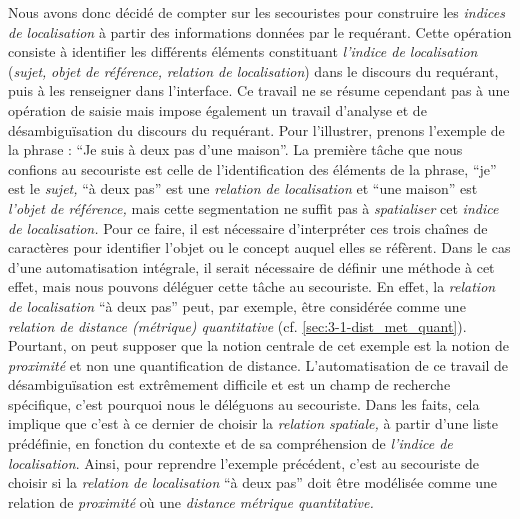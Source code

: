 Nous avons donc décidé de compter sur les secouristes pour construire
les \emph{indices de localisation} à partir des informations données
par le requérant. Cette opération consiste à identifier les différents
éléments constituant \emph{l'indice de localisation} (\emph{sujet,}
\emph{objet de référence,} \emph{relation de localisation}) dans le
discours du requérant, puis à les renseigner dans l'interface. Ce
travail ne se résume cependant pas à une opération de saisie mais
impose également un travail d'analyse et de désambiguïsation du
discours du requérant. Pour l'illustrer, prenons l'exemple de la
phrase : \enquote{Je suis à deux pas d'une maison}. La première tâche
que nous confions au secouriste est celle de l'identification des
éléments de la phrase, \enquote{je} est le \emph{sujet,} \enquote{à
  deux pas} est une \emph{relation de localisation} et \enquote{une
  maison} est \emph{l'objet de référence,} mais cette segmentation ne
suffit pas à \emph{spatialiser} cet \emph{indice de localisation.}
Pour ce faire, il est nécessaire d'interpréter ces trois chaînes de
caractères pour identifier l'objet ou le concept auquel elles se
réfèrent. Dans le cas d'une automatisation intégrale, il serait
nécessaire de définir une méthode à cet effet, mais nous pouvons
déléguer cette tâche au secouriste. En effet, la \emph{relation de
  localisation} \enquote{à deux pas} peut, par exemple, être
considérée comme une \emph{relation de distance (métrique)
  quantitative} (cf. \ref{sec:3-1-dist_met_quant}). Pourtant, on peut
supposer que la notion centrale de cet exemple est la notion de
\emph{proximité} et non une quantification de
distance. L'automatisation de ce travail de désambiguïsation est
extrêmement difficile et est un champ de recherche spécifique, c'est
pourquoi nous le déléguons au secouriste. Dans les faits, cela
implique que c'est à ce dernier de choisir la \emph{relation
  spatiale,} à partir d'une liste prédéfinie, en fonction du contexte
et de sa compréhension de \emph{l'indice de localisation}. Ainsi, pour
reprendre l'exemple précédent, c'est au secouriste de choisir si la
\emph{relation de localisation} \enquote{à deux pas} doit être
modélisée comme une relation de \emph{proximité} où une \emph{distance
  métrique quantitative.}

